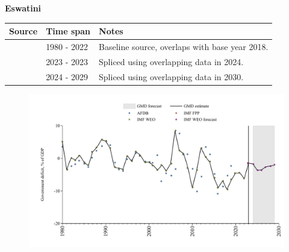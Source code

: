 \documentclass[12pt,a4paper,landscape]{article}
\begin{document}
\begin{adjustbox}{max totalsize={\paperwidth}{\paperheight},center}
\begin{minipage}[t][\textheight][t]{\textwidth}
\vspace*{0.5cm}
{}
\begin{center}
{\Large\bfseries Eswatini}
\end{center}
\vspace{0.5cm}
\begin{table}[H]
\centering
\small
\begin{tabular}{|l|l|l|}
\hline
\textbf{Source} & \textbf{Time span} & \textbf{Notes} \\
\hline
\rowcolor{white}\cite{IMF_WEO}& 1980 - 2022 &Baseline source, overlaps with base year 2018.\\
\rowcolor{lightgray}\cite{IMF_FPP}& 2023 - 2023 &Spliced using overlapping data in 2024.\\
\rowcolor{white}\cite{IMF_WEO_forecast}& 2024 - 2029 &Spliced using overlapping data in 2030.\\
\hline
\end{tabular}
\end{table}
\begin{figure}[H]
\centering
\includegraphics[width=\textwidth,height=0.6\textheight,keepaspectratio]{graphs/SWZ_govdef_GDP.pdf}
\end{figure}
\end{minipage}
\end{adjustbox}
\end{document}
